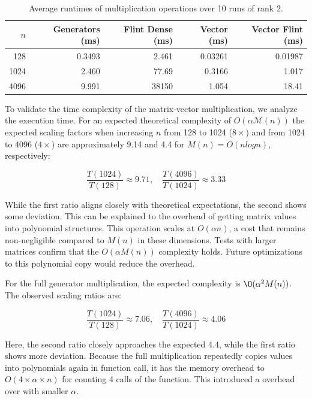 \begin{table}[htpb]
  \centering
  \begin{tabular}{r r r r r}
    \hline
    $n$  & Generators (ms) & Flint Dense (ms) & Vector (ms) & Vector Flint (ms) \\
    \hline
    128  & 0.3493          & 2.461            & 0.03261     & 0.01987 \\
    1024 & 2.460           & 77.69            & 0.3166      & 1.017 \\
    4096 & 9.991           & 38150            & 1.054       & 18.41 \\
    \hline
  \end{tabular}
  \caption{Average runtimes of multiplication operations over 10 runs
  of rank 2.}
  \label{tab:bench_mul}
\end{table}

To validate the time complexity of the matrix-vector multiplication,
we analyze the execution time. For an expected theoretical
complexity of $O(\alpha \mathcal{M}(n))$ the expected scaling factors
when increasing $n$ from 128 to 1024 ($8\times$) and from 1024 to
4096 ($4\times$) are approximately 9.14 and 4.4 for $M(n) = O(n
log n)$, respectively:

$$ \frac{T(1024)}{T(128)} \approx 9.71, \quad \frac{T(4096)}{T(1024)}
\approx 3.33 $$

While the first ratio aligns closely with theoretical expectations,
the second shows some deviation. This can be explained to
the overhead of getting matrix values into polynomial
structures. This operation scales at
$O(\alpha n)$, a cost that remains non-negligible compared
to $M(n)$ in these dimensions. Tests with larger
matrices confirm that the $O(\alpha M(n))$
complexity holds. Future optimizations to this polynomial
copy would reduce the overhead.

For the full generator multiplication, the expected
complexity is $\O(\alpha^2 M(n))$. The observed scaling ratios are:

$$ \frac{T(1024)}{T(128)} \approx 7.06, \quad \frac{T(4096)}{T(1024)}
\approx 4.06 $$

Here, the second ratio closely approaches the expected 4.4, while the
first ratio shows more deviation. Because the full multiplication
repeatedly copies values into polynomials again in function call, it has
the memory overhead to $O(4 \times \alpha \times n)$ for counting 4
calls of the function. This introduced a overhead over
with smaller $\alpha$.

